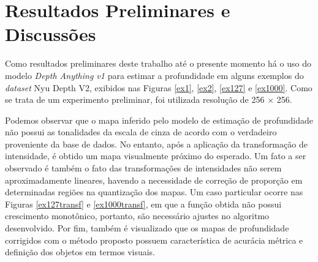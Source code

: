 
\chapter{Resultados Preliminares e Discussões}

Como resultados preliminares deste trabalho até o presente momento há o uso do modelo \textit{Depth Anything v1} \cite{yang2024depthv1} para estimar a profundidade em alguns exemplos do \textit{dataset} Nyu Depth V2, exibidos nas Figuras \ref{ex1}, \ref{ex2}, \ref{ex127} e \ref{ex1000}. Como se trata de um experimento preliminar, foi utilizada resolução de 256 $\times$ 256.

Podemos observar que o mapa inferido pelo modelo de estimação de profundidade não possui as tonalidades da escala de cinza de acordo com o verdadeiro proveniente da base de dados. No entanto, após a aplicação da transformação de intensidade, é obtido um mapa visualmente próximo do esperado. Um fato a ser observado é também o fato das transformações de intensidades não serem aproximadamente lineares, havendo a necessidade de correção de proporção em determinadas regiões na quantização dos mapas. Um caso particular ocorre nas Figuras \ref{ex127transf} e \ref{ex1000transf}, em que a função obtida não possui crescimento monotônico, portanto, são necessário ajustes no algoritmo desenvolvido. Por fim, também é visualizado que os mapas de profundidade corrigidos com o método proposto possuem característica de acurácia métrica e definição dos objetos em termos visuais.




